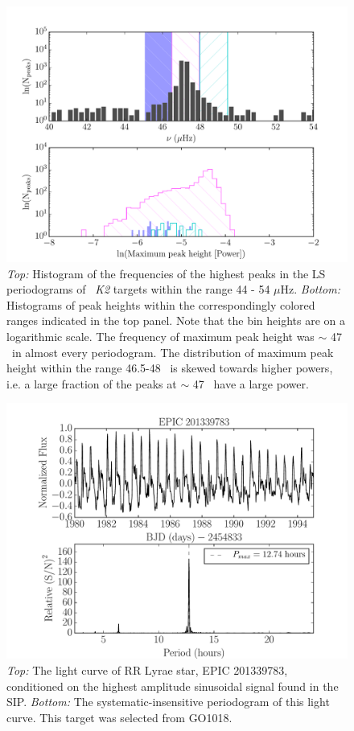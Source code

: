 \documentclass[useAMS, usenatbib, preprint, 12pt]{aastex}
\begin{document}
\begin{figure}
\begin{center}
\includegraphics[width=6in, clip=true]{vbg_hist.pdf}
\caption{{\it Top:} Histogram of the frequencies of the highest peaks in the
	LS
	periodograms of \nGO\ {\it K2} targets within the range 44 - 54 $\mu$Hz.
	{\it Bottom:} Histograms of peak heights within the correspondingly
	colored ranges indicated in the top panel.
	Note that the bin heights are on a logarithmic scale.
	The frequency of maximum peak height was $\sim$ 47 \uHz\ in almost
	every periodogram.
	The distribution of maximum peak height within the range 46.5-48 \uHz\
	is skewed towards higher powers, i.e. a large fraction of the peaks
	at $\sim$ 47 \uHz\ have a large power.
}
\label{fig:vbg_hist}
\end{center}
\end{figure}

\begin{figure}
\begin{center}
\includegraphics[width=6in, clip=true]{RR_201339783.pdf}
\caption{{\it Top:} The light curve of RR Lyrae star, EPIC 201339783,
	conditioned on the highest amplitude sinusoidal signal found in the
	SIP. {\it Bottom:} The systematic-insensitive periodogram of
	this light curve. This target was selected from GO1018.}
\label{fig:RRLyrae}
\end{center}
\end{figure}
\end{document}
